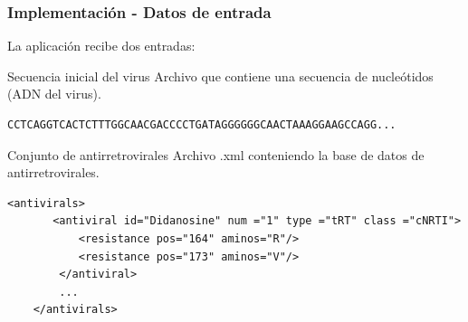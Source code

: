 \documentclass[xcolor=pdftex,dvipsnames,table,10pt,babel,spanish]{beamer}
\begin{document}
\begin{frame}[fragile]
    \frametitle{Implementaci\'on - Datos de entrada}
    La aplicaci\'on recibe dos entradas:
    \begin{block}{Secuencia inicial del virus}
	Archivo que contiene una secuencia de nucle\'otidos (ADN del virus).
	\scriptsize
       \begin{lstlisting}[basicstyle=\tt, frame=trBL, tabsize=4,fontadjust=true]
	  CCTCAGGTCACTCTTTGGCAACGACCCCTGATAGGGGGGCAACTAAAGGAAGCCAGG...
	\end{lstlisting}
    \end{block}
    \normalsize
    \begin{block}{Conjunto de antirretrovirales}
      Archivo .xml conteniendo la base de datos de antirretrovirales.
      \scriptsize
	\begin{lstlisting}[basicstyle=\tt, frame=trBL, tabsize=4] 
	<antivirals>
	   <antiviral id="Didanosine" num ="1" type ="tRT" class ="cNRTI">	
	       <resistance pos="164" aminos="R"/>
	       <resistance pos="173" aminos="V"/>
	    </antiviral>
	    ...
	</antivirals>
	\end{lstlisting}
	\normalsize
    \end{block}
\end{frame}


% 
\end{document}
